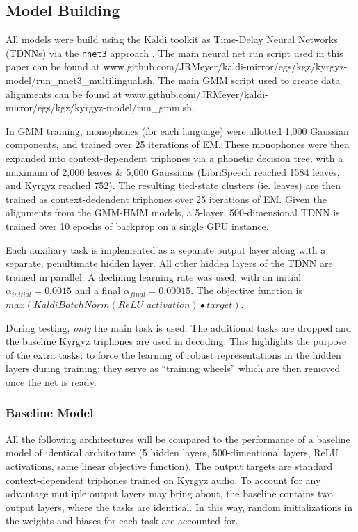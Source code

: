 \documentclass[a4paper]{article}
\begin{document}
\subsection{Model Building}

All models were build using the Kaldi toolkit as Time-Delay Neural Networks (TDNNs) via the \texttt{nnet3} approach \cite{povey2011,peddinti2015}. The main neural net run script used in this paper can be found at www.github.com/JRMeyer/kaldi-mirror/egs/kgz/kyrgyz-model/run\_nnet3\_multilingual.sh. The main GMM script used to create data alignments can be found at www.github.com/JRMeyer/kaldi-mirror/egs/kgz/kyrgyz-model/run\_gmm.sh.

In GMM training, monophones (for each language) were allotted 1,000 Gaussian components, and trained over 25 iterations of EM. These monophones were then expanded into context-dependent triphones via a phonetic decision tree, with a maximum of 2,000 leaves \& 5,000 Gaussians (LibriSpeech reached 1584 leaves, and Kyrgyz reached 752). The resulting tied-state clusters (ie. leaves) are then trained as context-dedendent triphones over 25 iterations of EM. Given the alignments from the GMM-HMM models, a 5-layer, 500-dimensional TDNN is trained over 10 epochs of backprop on a single GPU instance.

Each auxiliary task is implemented as a separate output layer along with a separate, penultimate hidden layer. All other hidden layers of the TDNN are trained in parallel. A declining learning rate was used, with an initial $\alpha_{initial}=0.0015$ and a final $\alpha_{final}=0.00015$. The objective function is $max( KaldiBatchNorm(ReLU\_activation) \bullet target )$.

During testing, \textit{only} the main task is used. The additional tasks are dropped and the baseline Kyrgyz triphones are used in decoding. This highlights the purpose of the extra tasks: to force the learning of robust representations in the hidden layers during training; they serve as ``training wheels'' which are then removed once the net is ready.



\subsubsection{Baseline Model}

All the following architectures will be compared to the performance of a baseline model of identical architecture (5 hidden layers, 500-dimentional layers, ReLU activations, same linear objective function). The output targets are standard context-dependent triphones trained on Kyrgyz audio. To account for any advantage mutliple output layers may bring about, the baseline contains two output layers, where the tasks are identical. In this way, random initializations in the weights and biases for each task are accounted for.
\end{document}

